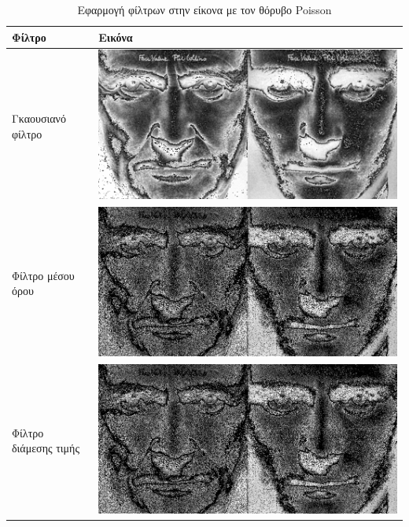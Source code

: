 \begin{table}
	\begin{tabular}{| p{8cm} | p{8cm}|}
		\hline
		\textbf{Φίλτρο} & \textbf{Εικόνα} \\
		\hline
		Γκαουσιανό φίλτρο &
		\includegraphics[width=\linewidth]{Figures/poisson_gauss_sharp} \\
		\hline
		Φίλτρο μέσου όρου &
		\includegraphics[width=\linewidth]{Figures/poisson_average_sharp} \\
		\hline
		Φίλτρο διάμεσης τιμής &
		\includegraphics[width=\linewidth]{Figures/poisson_median_blur} \\
		\hline
	\end{tabular}
	\label{tab:poisson}
	\caption{Εφαρμογή φίλτρων στην είκονα με τον θόρυβο Poisson}
\end{table}

